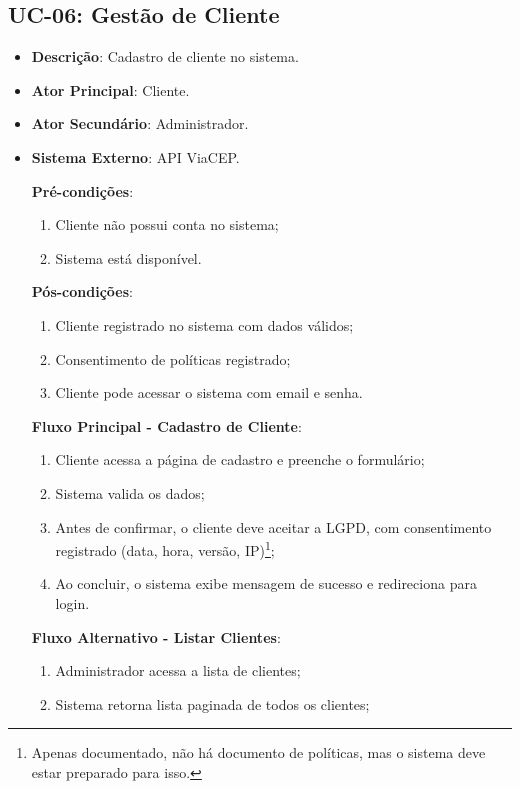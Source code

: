 \subsection{UC-06: Gestão de Cliente}

\begin{itemize}[topsep=1pt, itemsep=0pt]
  \item[]\textbf{Descrição}: Cadastro de cliente no sistema.

  \item[]\textbf{Ator Principal}: Cliente.

  \item[]\textbf{Ator Secundário}: Administrador.

  \item[]\textbf{Sistema Externo}: API ViaCEP.

  \textbf{Pré-condições}:
  \begin{enumerate}
    \item Cliente não possui conta no sistema;
    \item Sistema está disponível.
  \end{enumerate}

  \textbf{Pós-condições}:
  \begin{enumerate}
    \item Cliente registrado no sistema com dados válidos;
    \item Consentimento de políticas registrado;
    \item Cliente pode acessar o sistema com email e senha.
  \end{enumerate}

  \textbf{Fluxo Principal - Cadastro de Cliente}:
  \begin{enumerate}
    \item Cliente acessa a página de cadastro e preenche o formulário;
    \item Sistema valida os dados;
    \item Antes de confirmar, o cliente deve aceitar a LGPD, com consentimento registrado (data, hora, versão, IP)\footnote{Apenas documentado, não há documento de políticas, mas o sistema deve estar preparado para isso.};
    \item Ao concluir, o sistema exibe mensagem de sucesso e redireciona para login.
  \end{enumerate}

  \textbf{Fluxo Alternativo - Listar Clientes}:
  \begin{enumerate}
    \item Administrador acessa a lista de clientes;
    \item Sistema retorna lista paginada de todos os clientes;
  \end{enumerate}


\end{itemize}
